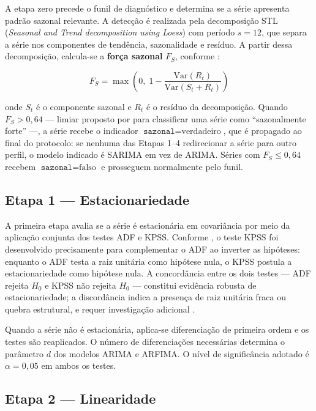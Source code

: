 \documentclass[
  12pt,
  openright,
  twoside,
  a4paper,
  english,
  brazil
]{abntex2}
\begin{document}
A etapa zero precede o funil de diagnóstico e determina se a série apresenta padrão sazonal relevante. A detecção é realizada pela decomposição STL (\textit{Seasonal and Trend decomposition using Loess}) com período $s = 12$, que separa a série nos componentes de tendência, sazonalidade e resíduo. A partir dessa decomposição, calcula-se a \textbf{força sazonal} $F_S$, conforme :

\begin{equation}
  F_S = \max\!\left(0,\; 1 - \frac{\text{Var}(R_t)}{\text{Var}(S_t + R_t)}\right)
  \label{eq:forca-sazonal}
\end{equation}

onde $S_t$ é o componente sazonal e $R_t$ é o resíduo da decomposição. Quando $F_S > 0{,}64$ — limiar proposto por  para classificar uma série como ``sazonalmente forte'' —, a série recebe o indicador $\texttt{sazonal} = \text{verdadeiro}$, que é propagado ao final do protocolo: se nenhuma das Etapas 1–4 redirecionar a série para outro perfil, o modelo indicado é SARIMA em vez de ARIMA. Séries com $F_S \leq 0{,}64$ recebem $\texttt{sazonal} = \text{falso}$ e prosseguem normalmente pelo funil.

\subsection{Etapa 1 — Estacionariedade}
\label{subsec:etapa1}

A primeira etapa avalia se a série é estacionária em covariância por meio da aplicação conjunta dos testes ADF e KPSS. Conforme , o teste KPSS foi desenvolvido precisamente para complementar o ADF ao inverter as hipóteses: enquanto o ADF testa a raiz unitária como hipótese nula, o KPSS postula a estacionariedade como hipótese nula. A concordância entre os dois testes — ADF rejeita $H_0$ e KPSS não rejeita $H_0$ — constitui evidência robusta de estacionariedade; a discordância indica a presença de raiz unitária fraca ou quebra estrutural, e requer investigação adicional \cite{kwiatkowski1992testing}.

Quando a série não é estacionária, aplica-se diferenciação de primeira ordem e os testes são reaplicados. O número de diferenciações necessárias determina o parâmetro $d$ dos modelos ARIMA e ARFIMA. O nível de significância adotado é $\alpha = 0{,}05$ em ambos os testes.

\subsection{Etapa 2 — Linearidade}
\label{subsec:etapa2}
\end{document}
